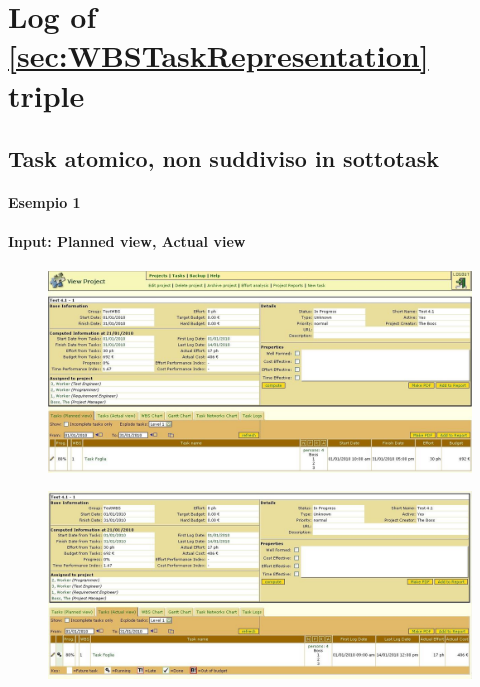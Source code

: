 \newpage

\section{Log of \ref{sec:WBSTaskRepresentation} triple}



\subsection{Task atomico, non suddiviso in sottotask}
\paragraph{Esempio 1}
\paragraph{Input: Planned view, Actual view}
\begin{figure}[h!]
\centering
\includegraphics[width=\textwidth]{tests/TEST_WBS/4.1/4.1_1/Esempio_1/input.png}
\end{figure}
\begin{figure}[h!]
\centering
\includegraphics[width=\textwidth]{tests/TEST_WBS/4.1/4.1_1/Esempio_1/input_actual.png}
\end{figure}
\newpage

